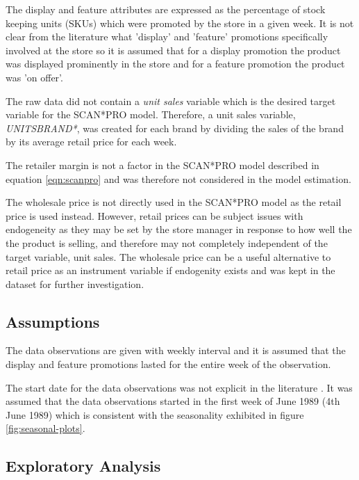 \documentclass[a4paper,11pt]{article}
\begin{document}
The display and feature attributes are expressed as the percentage of stock keeping units (SKUs) which were promoted by the store in a given week. It is not clear from the literature \citep{srinivasan_promotions_2004} what 'display' and 'feature' promotions specifically involved at the store so it is assumed that for a display promotion the product was displayed prominently in the store and for a feature promotion the product was 'on offer'. 

The raw data did not contain a \textit{unit sales} variable which is the desired target variable for the SCAN*PRO model. Therefore, a unit sales variable, \textit{UNITSBRAND*}, was created for each brand by dividing the sales of the brand by its average retail price for each week.

The retailer margin is not a factor in the SCAN*PRO model described in equation \ref{eqn:scanpro} and was therefore not considered in the model estimation.

The wholesale price is not directly used in the SCAN*PRO model as the retail price is used instead. However, retail prices can be subject issues with endogeneity as they may be set by the store manager in response to how well the the product is selling, and therefore may not completely independent of the target variable, unit sales. The wholesale price can be a useful alternative to retail price as an instrument variable if endogenity exists and was kept in the dataset for further investigation.



\subsection{Assumptions}
The data observations are given with weekly interval and it is assumed that the display and feature promotions lasted for the entire week of the observation.

The start date for the data observations was not explicit in the literature \citep{srinivasan_promotions_2004}. It was assumed that the data observations started in the first week of June 1989 (4th June 1989) which is consistent with the seasonality exhibited in figure \ref{fig:seasonal-plots}.

\subsection{Exploratory Analysis}
\end{document}
